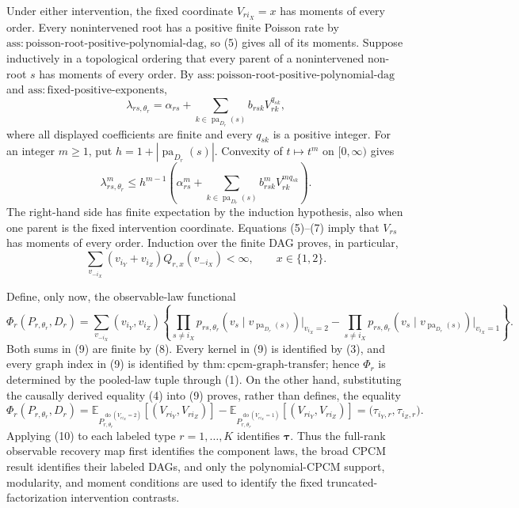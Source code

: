 Under either intervention, the fixed coordinate \(V_{r i_X}=x\) has moments of every order.  Every nonintervened root has a positive finite Poisson rate by \(\mathrm{ass{:}poisson\text{-}root\text{-}positive\text{-}polynomial\text{-}dag}\), so (5) gives all of its moments.  Suppose inductively in a topological ordering that every parent of a nonintervened non-root \(s\) has moments of every order.  By \(\mathrm{ass{:}poisson\text{-}root\text{-}positive\text{-}polynomial\text{-}dag}\) and \(\mathrm{ass{:}fixed\text{-}positive\text{-}exponents}\),
\[
\lambda_{rs,\theta_r}
=\alpha_{rs}+
\sum_{k\in\operatorname{pa}_{D_r}(s)}
b_{rsk}V_{rk}^{q_{sk}}, \tag{6}
\]
where all displayed coefficients are finite and every \(q_{sk}\) is a positive integer.  For an integer \(m\geq1\), put \(h=1+|\operatorname{pa}_{D_r}(s)|\).  Convexity of \(t\mapsto t^m\) on \([0,\infty)\) gives
\[
\lambda_{rs,\theta_r}^{m}
\leq h^{m-1}\!\left(
\alpha_{rs}^{m}+
\sum_{k\in\operatorname{pa}_{D_r}(s)}
b_{rsk}^{m}V_{rk}^{m q_{sk}}
\right). \tag{7}
\]
The right-hand side has finite expectation by the induction hypothesis, also when one parent is the fixed intervention coordinate.  Equations (5)--(7) imply that \(V_{rs}\) has moments of every order.  Induction over the finite DAG proves, in particular,
\[
\sum_{v_{-i_X}}(v_{i_Y}+v_{i_Z})Q_{r,x}(v_{-i_X})<\infty,
\qquad x\in\{1,2\}. \tag{8}
\]

Define, only now, the observable-law functional
\[
\Phi_r(P_{r,\theta_r},D_r)
=\sum_{v_{-i_X}}(v_{i_Y},v_{i_Z})
\left\{
\prod_{s\ne i_X}p_{rs,\theta_r}\!\left(v_s\mid
v_{\operatorname{pa}_{D_r}(s)}\right)\Big|_{v_{i_X}=2}
-
\prod_{s\ne i_X}p_{rs,\theta_r}\!\left(v_s\mid
v_{\operatorname{pa}_{D_r}(s)}\right)\Big|_{v_{i_X}=1}
\right\}. \tag{9}
\]
Both sums in (9) are finite by (8).  Every kernel in (9) is identified by (3), and every graph index in (9) is identified by \(\mathrm{thm{:}cpcm\text{-}graph\text{-}transfer}\); hence \(\Phi_r\) is determined by the pooled-law tuple through (1).  On the other hand, substituting the causally derived equality (4) into (9) proves, rather than defines, the equality
\[
\Phi_r(P_{r,\theta_r},D_r)
=\mathbb E_{P_{r,\theta_r}^{\operatorname{do}(V_{r i_X}=2)}}
[(V_{r i_Y},V_{r i_Z})]
-\mathbb E_{P_{r,\theta_r}^{\operatorname{do}(V_{r i_X}=1)}}
[(V_{r i_Y},V_{r i_Z})]
=\bigl(\tau_{i_Y,r},\tau_{i_Z,r}\bigr). \tag{10}
\]
Applying (10) to each labeled type \(r=1,\ldots,K\) identifies \(\boldsymbol\tau\).  Thus the full-rank observable recovery map first identifies the component laws, the broad CPCM result identifies their labeled DAGs, and only the polynomial-CPCM support, modularity, and moment conditions are used to identify the fixed truncated-factorization intervention contrasts.
